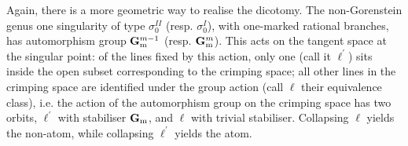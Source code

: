 \documentclass{compositio}
\newcommand{\Gm}{\mathbb{G}_{\rm{m}}}
\theoremstyle{plain}
\theoremstyle{definition}
\theoremstyle{remark}
\begin{document}
Again, there is a more geometric way to realise the dicotomy. The non-Gorenstein genus one singularity of type $\sigma_0^{I\!I}$ (resp. $\sigma_0^{I}$), with one-marked rational branches, has automorphism group $\Gm^{m-1}$ (resp. $\Gm^m$). This acts on the tangent space at the singular point: of the lines fixed by this action, only one (call it $\ell^\prime$) sits inside the open subset corresponding to the crimping space; all other lines in the crimping space are identified under the group action (call $\ell$ their equivalence class), i.e. the action of the automorphism group on the crimping space has two orbits, $\ell^\prime$ with stabiliser $\Gm$, and $\ell$ with trivial stabiliser. Collapsing $\ell$ yields the non-atom, while collapsing $\ell^\prime$ yields the atom.




 
 
\end{document}
